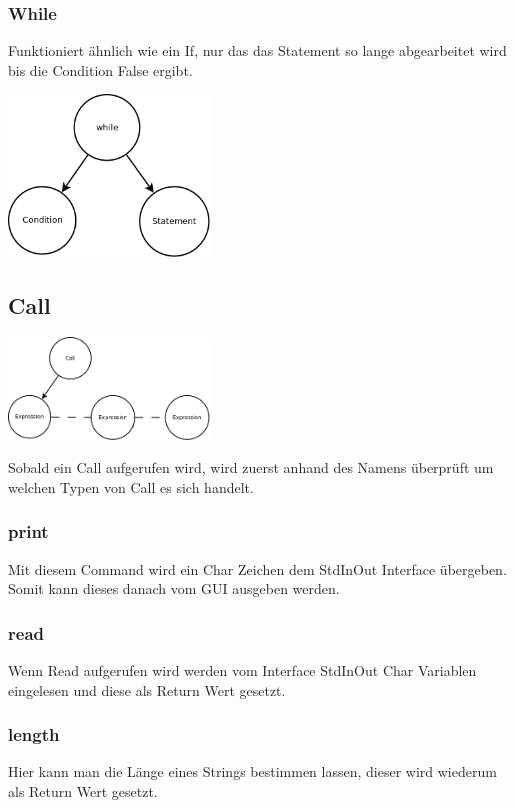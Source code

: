 \subsubsection{While}
Funktioniert ähnlich wie ein If, nur das das Statement so lange abgearbeitet wird bis die Condition False ergibt.

\includegraphics[width=0.4\textwidth]{./media/images/interpreter/syntaxbaum/statements/while.png}

\subsection{Call}
\includegraphics[width=0.4\textwidth]{./media/images/interpreter/syntaxbaum/statements/call.png}

Sobald ein Call aufgerufen wird, wird zuerst anhand des Namens überprüft um welchen Typen von Call es sich handelt.

\subsubsection{print}
Mit diesem Command wird ein Char Zeichen dem StdInOut Interface übergeben. Somit kann dieses danach vom GUI ausgeben werden.

\subsubsection{read}
Wenn Read aufgerufen wird werden vom Interface StdInOut Char Variablen eingelesen und diese als Return Wert gesetzt.

\subsubsection{length}
Hier kann man die Länge eines Strings bestimmen lassen, dieser wird wiederum als Return Wert gesetzt.


